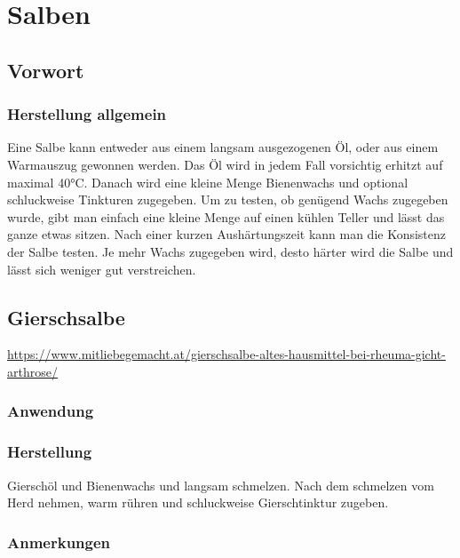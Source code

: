 \chapter{Salben}

\section{Vorwort}

\lipsum[1-5]
\newpage



\subsection{Herstellung allgemein}

Eine Salbe kann entweder aus einem langsam ausgezogenen Öl, oder aus einem Warmauszug gewonnen werden. Das Öl wird in jedem Fall vorsichtig erhitzt auf maximal 40°C. Danach wird eine kleine Menge Bienenwachs und optional schluckweise Tinkturen zugegeben. Um zu testen, ob genügend Wachs zugegeben wurde, gibt man einfach eine kleine Menge auf einen kühlen Teller und lässt das ganze etwas sitzen. Nach einer kurzen Aushärtungszeit kann man die Konsistenz der Salbe testen. Je mehr Wachs zugegeben wird, desto härter wird die Salbe und lässt sich weniger gut verstreichen.



\section{Gierschsalbe}

\url{https://www.mitliebegemacht.at/gierschsalbe-altes-hausmittel-bei-rheuma-gicht-arthrose/}

    

\subsection{Anwendung}

\subsection{Herstellung}

Gierschöl und Bienenwachs und langsam schmelzen. Nach dem schmelzen vom Herd nehmen, warm rühren und schluckweise Gierschtinktur zugeben.

\subsection{Anmerkungen}





